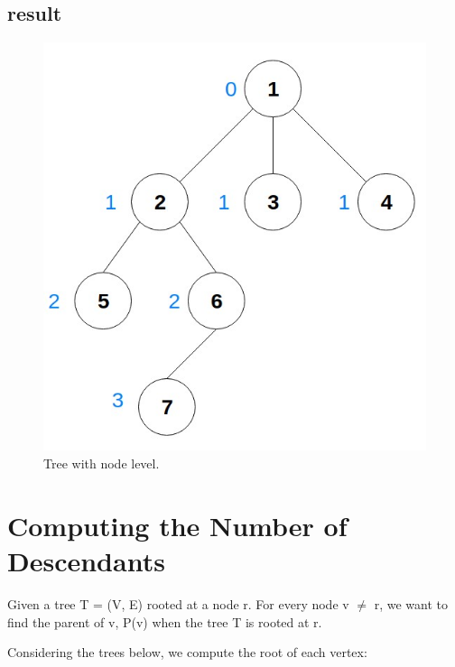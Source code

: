 \documentclass[twoside]{article}
\begin{document}
\subsection{result}
\begin{figure} [!h]
\centering
\begin{minipage}{.5\textwidth}
  \centering
  \includegraphics[scale=.3]{g4}
  \caption{Tree with node level.} 
  \label{fig:test1}
\end{minipage}%
\end{figure}


\section{Computing the Number of Descendants}
Given a tree T = (V, E) rooted at a node r. For every node v $\neq$ r, we want to find the parent of v, P(v) when the tree T is rooted at r.

Considering the trees below, we compute the root of each vertex:
\end{document}
